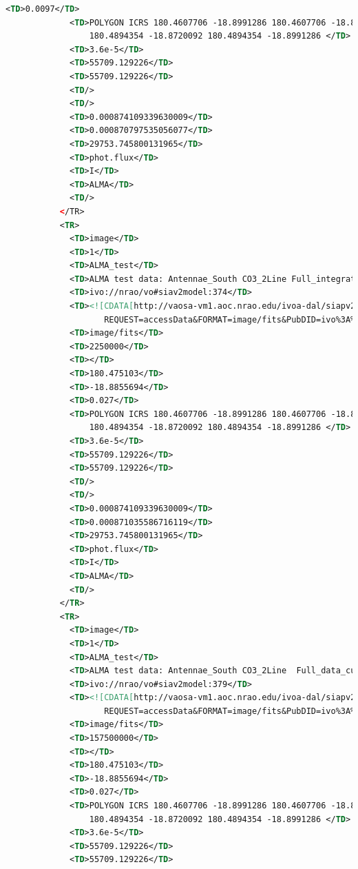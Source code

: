 \documentclass[11pt,a4paper]{ivoa}
\begin{document}
\begin{lstlisting}[basicstyle=\scriptsize,language=XML]
             <TD>0.0097</TD> 
             <TD>POLYGON ICRS 180.4607706 -18.8991286 180.4607706 -18.8720092
                 180.4894354 -18.8720092 180.4894354 -18.8991286 </TD> 
             <TD>3.6e-5</TD> 
             <TD>55709.129226</TD> 
             <TD>55709.129226</TD> 
             <TD/> 
             <TD/> 
             <TD>0.000874109339630009</TD> 
             <TD>0.000870797535056077</TD> 
             <TD>29753.745800131965</TD> 
             <TD>phot.flux</TD> 
             <TD>I</TD> 
             <TD>ALMA</TD> 
             <TD/> 
           </TR> 
           <TR>  
             <TD>image</TD> 
             <TD>1</TD> 
             <TD>ALMA_test</TD> 
             <TD>ALMA test data: Antennae_South CO3_2Line Full_integrated_intensity</TD> 
             <TD>ivo://nrao/vo#siav2model:374</TD> 
             <TD><![CDATA[http://vaosa-vm1.aoc.nrao.edu/ivoa-dal/siapv2-vao/sync?
                    REQUEST=accessData&FORMAT=image/fits&PubDID=ivo%3A%2F%2Fnrao%2Fvo%23siav2model%3A374]]></TD> 
             <TD>image/fits</TD> 
             <TD>2250000</TD> 
             <TD></TD> 
             <TD>180.475103</TD> 
             <TD>-18.8855694</TD> 
             <TD>0.027</TD> 
             <TD>POLYGON ICRS 180.4607706 -18.8991286 180.4607706 -18.8720092
                 180.4894354 -18.8720092 180.4894354 -18.8991286 </TD> 
             <TD>3.6e-5</TD> 
             <TD>55709.129226</TD> 
             <TD>55709.129226</TD> 
             <TD/> 
             <TD/> 
             <TD>0.000874109339630009</TD> 
             <TD>0.000871035586716119</TD> 
             <TD>29753.745800131965</TD> 
             <TD>phot.flux</TD> 
             <TD>I</TD> 
             <TD>ALMA</TD> 
             <TD/> 
           </TR> 
           <TR> 
             <TD>image</TD> 
             <TD>1</TD> 
             <TD>ALMA_test</TD> 
             <TD>ALMA test data: Antennae_South CO3_2Line  Full_data_cube</TD>  
             <TD>ivo://nrao/vo#siav2model:379</TD> 
             <TD><![CDATA[http://vaosa-vm1.aoc.nrao.edu/ivoa-dal/siapv2-vao/sync?
                    REQUEST=accessData&FORMAT=image/fits&PubDID=ivo%3A%2F%2Fnrao%2Fvo%23siav2model%3A379]]></TD> 
             <TD>image/fits</TD> 
             <TD>157500000</TD> 
             <TD></TD> 
             <TD>180.475103</TD> 
             <TD>-18.8855694</TD> 
             <TD>0.027</TD> 
             <TD>POLYGON ICRS 180.4607706 -18.8991286 180.4607706 -18.8720092
                 180.4894354 -18.8720092 180.4894354 -18.8991286 </TD> 
             <TD>3.6e-5</TD> 
             <TD>55709.129226</TD> 
             <TD>55709.129226</TD> 

\end{lstlisting}
\end{document}
